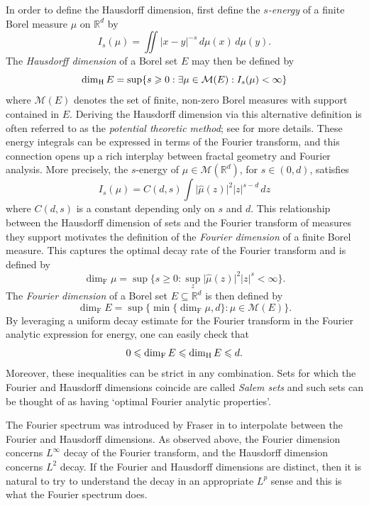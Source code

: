 \documentclass[11pt]{amsart}
\numberwithin{equation}{section}
\newcommand{\rd}{\mathbb{R}^d}
\newcommand{\M}{\mathcal{M}}
\renewcommand{\geq}{\geqslant}
\renewcommand{\leq}{\leqslant}
\newcommand{\hd}{\dim_{\textup{H}}}
\newcommand{\fd}{\dim_{\mathrm{F}}}
\theoremstyle{plain}
\theoremstyle{remark}
\begin{document}
In order to define the Hausdorff dimension, first define the  \emph{$s$-energy} of a finite Borel measure $\mu$ on $\rd$  by
\begin{equation*}
		I_{s}(\mu) = \iint |x-y|^{-s}\,d\mu(x)\,d\mu(y).
\end{equation*}
The \emph{Hausdorff dimension} of a Borel set $E$ may then be defined by
\begin{equation*}
		\hd E = \sup\{ s\geq0 : \exists \mu\in\M(E) : I_{s}(\mu)<\infty \}
\end{equation*}
where $\M(E)$ denotes the set of finite, non-zero Borel measures with support contained in $E$. Deriving the Hausdorff dimension via this alternative definition is often referred to as the \emph{potential theoretic method};  see \cite{falconer,mattila} for more details.  These energy integrals can be expressed in terms of the Fourier transform, and this connection opens up a rich interplay between fractal geometry and Fourier analysis. More precisely, the $s$-energy of $\mu\in\M(\rd)$, for $s\in(0,d)$, satisfies
\begin{equation} \label{energyequiv}
		I_{s}(\mu) =C({d,s}) \int \big| \widehat{\mu}(z) \big|^2 |z|^{s-d}\,dz
\end{equation}
where $C(d,s)$ is a constant depending only on $s$ and $d$. This relationship between the Hausdorff dimension of sets and the Fourier transform of measures they support motivates the definition of the \emph{Fourier dimension} of a finite Borel measure.  This captures the optimal decay rate of the Fourier transform and is defined by
\begin{equation*}
		\fd \mu = \sup\big\{ s\geq0 : \sup_z\big| \widehat{\mu}(z) \big|^2  |z|^{s} < \infty \big\}.
\end{equation*}
The \emph{Fourier dimension} of a Borel set  $E\subseteq\rd$ is then defined by 
\begin{equation*}
		\fd E = \sup\big\{ \min\{ \fd \mu,  d\} : \mu\in\M(E) \big\}.
\end{equation*}
By leveraging  a uniform decay estimate for the Fourier transform in the Fourier analytic expression for energy, one can easily check that
\[
0\leq\fd E\leq\hd E \leq d.
\]
Moreover,   these inequalities can be strict in any combination. Sets for which the Fourier and Hausdorff dimensions coincide are called \emph{Salem sets} and such sets can be thought of as having `optimal Fourier analytic properties'.




The Fourier spectrum was introduced by   Fraser  in \cite{JMF} to interpolate between the Fourier   and Hausdorff dimensions. As observed above, the Fourier dimension concerns $L^\infty$ decay of the Fourier transform, and the Hausdorff dimension concerns  $L^2$ decay.   If the Fourier  and Hausdorff dimensions are distinct, then it is natural  to try to understand the decay in an appropriate $L^p$ sense and this is what the Fourier spectrum does.  
\end{document}
